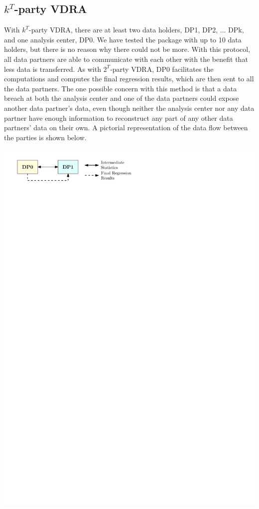 \documentclass[12]{article}
\begin{document}
\subsection{$k^T$-party VDRA}

With $k^T$-party VDRA, there are at least two data holders, DP1, DP2, ... DPk, and one analysis center, DP0.  We have tested the package with up to 10 data holders, but there is no reason why there could not be more.  With this protocol, all data partners are able to communicate with each other with the benefit that less data is transferred.  As with $2^T$-party VDRA, DP0 facilitates the computations and computes the final regression results, which are then sent to all the data partners.  The one possible concern with this method is that a data breach at both the analysis center and one of the data partners could expose another data partner's data, even though neither the analysis center nor any data partner have enough information to reconstruct any part of any other data partners' data on their own.  A pictorial representation of the data flow between the parties is shown below.  
\begin{center}
	\includegraphics[page = 3]{images.pdf}
\end{center}
\end{document}
